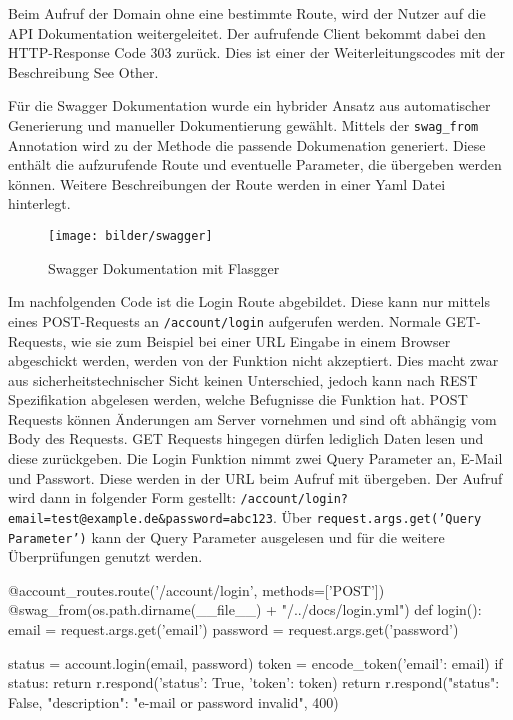Beim Aufruf der Domain ohne eine bestimmte Route, wird der Nutzer auf die API Dokumentation weitergeleitet. Der aufrufende Client bekommt dabei den HTTP-Response Code 303 zurück. Dies ist einer der Weiterleitungscodes mit der Beschreibung \glqq See Other\grqq{}.

Für die Swagger Dokumentation wurde ein hybrider Ansatz aus automatischer Generierung und manueller Dokumentierung gewählt. Mittels der \texttt{swag\_{}from} Annotation wird zu der Methode die passende Dokumenation generiert. Diese enthält die aufzurufende Route und eventuelle Parameter, die übergeben werden können. Weitere Beschreibungen der Route werden in einer Yaml Datei hinterlegt.

\begin{figure}[H]
  \centering
    \texttt{[image: bilder/swagger]}
    \caption{Swagger Dokumentation mit Flasgger}
\end{figure}

Im nachfolgenden Code ist die Login Route abgebildet. Diese kann nur mittels eines POST-Requests an \texttt{/account/login} aufgerufen werden. Normale GET-Requests, wie sie zum Beispiel bei einer URL Eingabe in einem Browser abgeschickt werden, werden von der Funktion nicht akzeptiert. Dies macht zwar aus sicherheitstechnischer Sicht keinen Unterschied, jedoch kann nach REST Spezifikation abgelesen werden, welche Befugnisse die Funktion hat. POST Requests können Änderungen am Server vornehmen und sind oft abhängig vom Body des Requests. GET Requests hingegen dürfen lediglich Daten lesen und diese zurückgeben. Die Login Funktion nimmt zwei Query Parameter an, E-Mail und Passwort. Diese werden in der URL beim Aufruf mit übergeben. Der Aufruf wird dann in folgender Form gestellt: \texttt{/account/login?email=test@example.de\&{}password=abc123}. Über \texttt{request.args.get('Query Parameter')} kann der Query Parameter ausgelesen und für die weitere Überprüfungen genutzt werden. 

\begin{python}
@account_routes.route('/account/login', methods=['POST'])
@swag_from(os.path.dirname(__file__) + "/../docs/login.yml")
def login():
    email = request.args.get('email')
    password = request.args.get('password')

    status = account.login(email, password)
    token = encode_token({'email': email})
    if status:
        return r.respond({'status': True, 'token': token})
    return r.respond({"status": False, "description": "e-mail or password invalid"}, 400)
\end{python}

